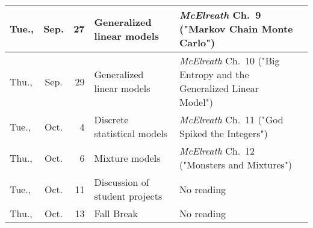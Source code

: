 \documentclass[11pt,twoside]{jgsyllabus}\usepackage[]{graphicx}\usepackage[]{xcolor}
\begin{document}
\begin{center}
\begin{tabular}{l@{~}c@{~}r>{\raggedright}m{2.6in}>{\centering}m{2in}c}
   \midrule
Tue., & Sep. &  27 & Generalized linear models & \emph{McElreath\/} Ch.~9 ("Markov Chain Monte Carlo") &  \\ 
   \midrule
Thu., & Sep. &  29 & Generalized linear models & \emph{McElreath\/} Ch.~10 ("Big Entropy and the Generalized Linear Model") &  \\ 
   \midrule
Tue., & Oct. &   4 & Discrete statistical models & \emph{McElreath\/} Ch.~11 ("God Spiked the Integers") &  \\ 
   \midrule
Thu., & Oct. &   6 & Mixture models & \emph{McElreath\/} Ch.~12 ("Monsters and Mixtures") &  \\ 
   \midrule
Tue., & Oct. &  11 & Discussion of student projects & No reading &  \\ 
   \midrule
Thu., & Oct. &  13 & Fall Break & No reading &  \\ 
   \bottomrule
\end{tabular}

\end{center}
\end{document}
